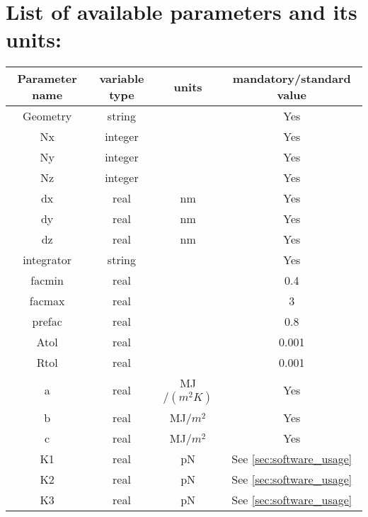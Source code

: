 \documentclass[final,5p,times,twocolumn]{elsarticle}
\begin{document}
 
\section{List of available parameters and its units:}
 \label{apx:list_of_parameters}

 \onecolumn
 \begin{center}
	\begin{longtable}{|c|c|c|c|}
          \hline 
          Parameter name  & variable type	& units & mandatory/standard value\\ 
          \hline 
          {Geometry}	& string & 	& Yes  \\ 
          \hline 
          {Nx}	& integer &	& Yes \\ 
          \hline                                  
          {Ny}	& integer &      & Yes \\ 
          \hline                                  
          {Nz}	& integer &      & Yes \\ 
          \hline                                  
          {dx}	& real & nm      & Yes \\ 
          \hline                                  
          {dy}	& real & nm   & Yes \\ 
          \hline                                  
          {dz}	& real & nm	& Yes \\ 
          \hline 
          {integrator}	& string & & Yes\\ 
          \hline 
          facmin	& real &   & 0.4\\ 
          \hline 
          facmax	& real &   & 3\\ 
          \hline 
          prefac	& real &  & 0.8\\ 
          \hline 
          Atol	& real &  &0.001\\ 
          \hline 
          Rtol & real &  &0.001\\ 
          \hline 
          {a} & real& MJ$/(m^2 K)$ & Yes\\
          \hline 
          {b} & real& MJ$/m^2$ & Yes\\ 
          \hline
          {c} & real& MJ$/m^2$ & Yes\\ 
          \hline 
          {K1} & real &  pN  &  See \ref{sec:software_usage}\\ 
          \hline
          {K2} & real &  pN  &  See \ref{sec:software_usage}\\ 
          \hline
          {K3} & real &  pN  &  See \ref{sec:software_usage}\\ 

\end{longtable}
\end{center}
\end{document}
